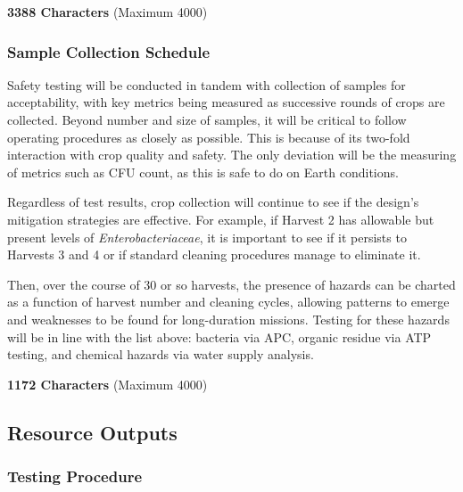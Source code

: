 
\textbf{3388 Characters} (Maximum 4000)

\subsubsection{Sample Collection Schedule}
Safety testing will be conducted in tandem with collection of samples for acceptability, with key metrics being measured as successive rounds of crops are collected. Beyond number and size of samples, it will be critical to follow operating procedures as closely as possible. This is because of its two-fold interaction with crop quality and safety. The only deviation will be the measuring of metrics such as CFU count, as this is safe to do on Earth conditions.

Regardless of test results, crop collection will continue to see if the design's mitigation strategies are effective. For example, if Harvest 2 has allowable but present levels of \textit{Enterobacteriaceae}, it is important to see if it persists to Harvests 3 and 4 or if standard cleaning procedures manage to eliminate it.

Then, over the course of 30 or so harvests, the presence of hazards can be charted as a function of harvest number and cleaning cycles, allowing patterns to emerge and weaknesses to be found for long-duration missions. Testing for these hazards will be in line with the list above: bacteria via APC, organic residue via ATP testing, and chemical hazards via water supply analysis.


\textbf{1172 Characters} (Maximum 4000)

\clearpage

\subsection{Resource Outputs}

\subsubsection{Testing Procedure}


